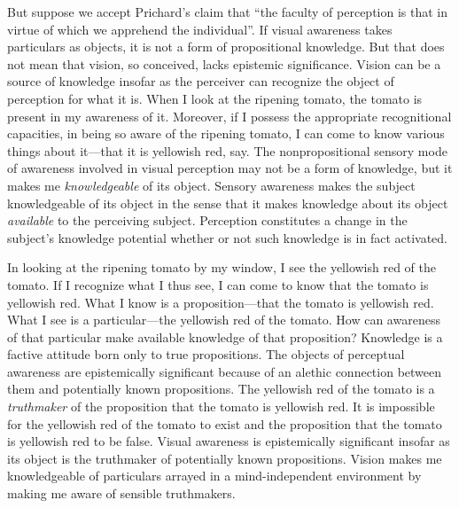 \documentclass[12pt]{article}
\begin{document}
But suppose we accept Prichard's claim that ``the faculty of perception is that in virtue of which we apprehend the individual''. If visual awareness takes particulars as objects, it is not a form of propositional knowledge. But that does not mean that vision, so conceived, lacks epistemic significance. Vision can be a source of knowledge insofar as the perceiver can recognize the object of perception for what it is. When I look at the ripening tomato, the tomato is present in my awareness of it. Moreover, if I possess the appropriate recognitional capacities, in being so aware of the ripening tomato, I can come to know various things about it---that it is yellowish red, say. The nonpropositional sensory mode of awareness involved in visual perception may not be a form of knowledge, but it makes me \emph{knowledgeable} of its object. Sensory awareness makes the subject knowledgeable of its object in the sense that it makes knowledge about its object \emph{available} to the perceiving subject. Perception constitutes a change in the subject's knowledge potential whether or not such knowledge is in fact activated.

In looking at the ripening tomato by my window, I see the yellowish red of the tomato. If I recognize what I thus see, I can come to know that the tomato is yellowish red. What I know is a proposition---that the tomato is yellowish red. What I see is a particular---the yellowish red of the tomato. How can awareness of that particular make available knowledge of that proposition? Knowledge is a factive attitude born only to true propositions. The objects of perceptual awareness are epistemically significant because of an alethic connection between them and potentially known propositions. The yellowish red of the tomato is a \emph{truthmaker} of the proposition that the tomato is yellowish red. It is impossible for the yellowish red of the tomato to exist and the proposition that the tomato is yellowish red to be false. Visual awareness is epistemically significant insofar as its object is the truthmaker of potentially known propositions. Vision makes me knowledgeable of particulars arrayed in a mind-independent environment by making me aware of sensible truthmakers.
\end{document}
